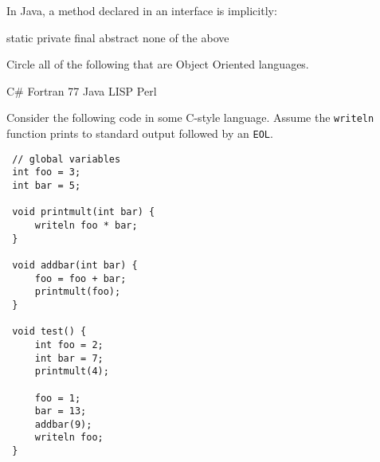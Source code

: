 \documentclass[addpoints]{exam}
\begin{document}
\begin{questions}
\vspace{2em}

\question[2]
In Java, a method declared in an interface is implicitly:\\
\begin{choices}
 \choice static
 \choice private
 \choice final
 \choice abstract
 \choice none of the above
\end{choices}

\vspace{2em}

\question[2]
Circle all of the following that are Object Oriented languages.\\
\begin{choices}
 \choice C\#
 \choice Fortran 77
 \choice Java
 \choice LISP
 \choice Perl
\end{choices}

\newpage

\question
Consider the following code in some C-style language. Assume the \verb|writeln| function prints to standard output followed by an \verb|EOL|.

\begin{lstlisting}
 // global variables
 int foo = 3;
 int bar = 5;
 
 void printmult(int bar) {
     writeln foo * bar;
 }
 
 void addbar(int bar) {
     foo = foo + bar;
     printmult(foo);
 }
 
 void test() {
     int foo = 2;
     int bar = 7;
     printmult(4);
     
     foo = 1;
     bar = 13;
     addbar(9);
     writeln foo;
 }
\end{lstlisting}



\end{questions}
\end{document}
